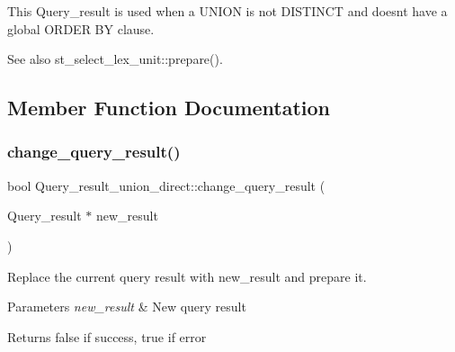 This Query\+\_\+result is used when a U\+N\+I\+ON is not D\+I\+S\+T\+I\+N\+CT and doesn\textquotesingle{}t have a global O\+R\+D\+ER BY clause. \begin{DoxySeeAlso}{See also}
st\+\_\+select\+\_\+lex\+\_\+unit\+::prepare(). 
\end{DoxySeeAlso}


\subsection{Member Function Documentation}
\mbox{\label{classQuery__result__union__direct_a22f70374a68909fb2a45d207639ca70a}} 
\subsubsection{\texorpdfstring{change\+\_\+query\+\_\+result()}{change\_query\_result()}}
{\footnotesize\ttfamily bool Query\+\_\+result\+\_\+union\+\_\+direct\+::change\+\_\+query\+\_\+result (\begin{DoxyParamCaption}\item[{Query\+\_\+result $\ast$}]{new\+\_\+result }\end{DoxyParamCaption})}

Replace the current query result with new\+\_\+result and prepare it. ~\newline
 
\begin{DoxyParams}{Parameters}
{\em new\+\_\+result} & New query result\\
\hline
\end{DoxyParams}
\begin{DoxyReturn}{Returns}
false if success, true if error 
\end{DoxyReturn}
\mbox{\label{classQuery__result__union__direct_af8c3f38e8a9597784871d3d9a6d5839a}} 
